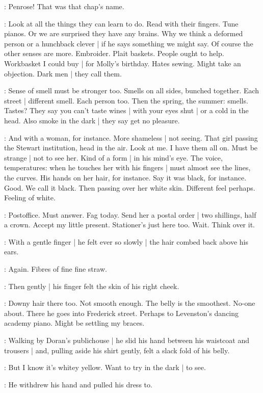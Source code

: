 \BloomInt:
Penrose!
That was that chap's name.

\BloomInt:
Look at all the things they can learn to do.
Read with their fingers.
Tune pianos.
Or we are surprised they have any brains.
Why we think a deformed person or a hunchback clever |
if he says something we might say.
Of course the other senses are more.
Embroider.
Plait baskets.
People ought to help.
Workbasket I could buy |
for Molly's birthday.
Hates sewing.
Might take an objection.
Dark men |
they call them.

\BloomInt:
Sense of smell must be stronger too.
Smells on all sides, bunched together.
Each street |
different smell.
Each person too.
Then the spring, the summer:
smells.
Tastes?
They say you can't taste wines |
with your eyes shut |
or a cold in the head.
Also smoke in the dark |
they say get no pleasure.

\BloomInt:
And with a woman, for instance.
More shameless |
not seeing.
That girl passing the Stewart institution,
head in the air.
Look at me.
I have them all on.
Must be strange |
not to see her.
Kind of a form |
in his mind's eye.
The voice, temperatures:
when he touches her with his fingers |
must almost see the lines, the curves.
His hands on her hair, for instance.
Say it was black, for instance.
Good.
We call it black.
Then passing over her white skin.
Different feel perhaps.
Feeling of white.

\BloomInt:
Postoffice.
Must answer.
Fag today.
Send her a postal order |
two shillings, half a crown.
Accept my little present.
Stationer's just here too.
Wait.
Think over it.

:
With a gentle finger |
he felt ever so slowly |
the hair combed back above his ears.

\BloomInt:
Again.
Fibres of fine fine straw.

:
Then gently |
his finger felt the skin of his right cheek.

\BloomInt:
Downy hair there too.
Not smooth enough.
The belly is the smoothest.
No-one about.
There he goes into Frederick street.
Perhaps to Levenston's dancing academy piano.
Might be settling my braces.

:
Walking by Doran's publichouse |
he slid his hand between his waistcoat and trousers |
and, pulling aside his shirt gently,
felt a slack fold of his belly.

\BloomInt:
But I know it's whitey yellow.
Want to try in the dark |
to see.

:
He withdrew his hand and pulled his dress to.

